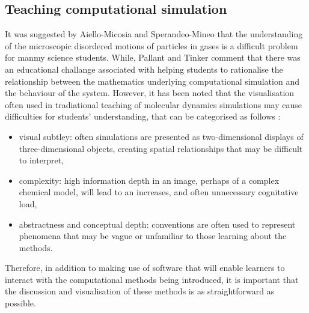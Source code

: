 \subsection{Teaching computational simulation}
It was suggested by Aiello-Micosia and Sperandeo-Mineo \cite{aiello-nicosia_computer_1985} that the understanding of the microscopic disordered motions of particles in gases is a difficult problem for manmy science students.
While, Pallant and Tinker \cite{pallant_reasoning_2004} comment that there was an educational challange associated with helping students to rationalise the relationship between the mathematics underlying computational simulation and the behaviour of the system.
However, it has been noted that the visualisation often used in tradiational teaching of molecular dynamics simulations may cause difficulties for students' understanding, that can be categorised as follows \cite{jones_molecular_2005}:
\begin{itemize}
\item visual subtley: often simulations are presented as two-dimensional displays of three-dimensional objects, creating spatial relationships that may be difficult to interpret,
\item complexity: high information depth in an image, perhaps of a complex chemical model, will lead to an increases, and often unnecessary cognitative load,
\item abstractness and conceptual depth: conventions are often used to represent phenomena that may be vague or unfamiliar to those learning about the methods.
\end{itemize}
Therefore, in addition to making use of software that will enable learners to interact with the computational methods being introduced, it is important that the discussion and visualisation of these methods is as straightforward as possible.
